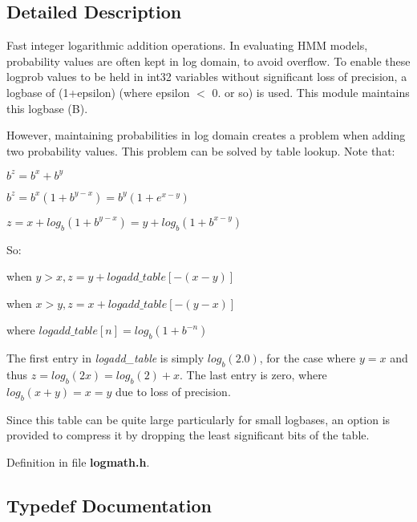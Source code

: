 \subsection{\-Detailed \-Description}
\-Fast integer logarithmic addition operations. \-In evaluating \-H\-M\-M models, probability values are often kept in log domain, to avoid overflow. \-To enable these logprob values to be held in int32 variables without significant loss of precision, a logbase of (1+epsilon) (where epsilon $<$ 0. or so) is used. \-This module maintains this logbase (\-B).

\-However, maintaining probabilities in log domain creates a problem when adding two probability values. \-This problem can be solved by table lookup. \-Note that\-:


\begin{DoxyItemize}
\item $ b^z = b^x + b^y $
\item $ b^z = b^x(1 + b^{y-x}) = b^y(1 + e^{x-y}) $
\item $ z = x + log_b(1 + b^{y-x}) = y + log_b(1 + b^{x-y}) $
\end{DoxyItemize}

\-So\-:


\begin{DoxyItemize}
\item when $ y > x, z = y + logadd\_table[-(x-y)] $
\item when $ x > y, z = x + logadd\_table[-(y-x)] $
\item where $ logadd\_table[n] = log_b(1 + b^{-n}) $
\end{DoxyItemize}

\-The first entry in {\itshape logadd\-\_\-table\/} is simply $ log_b(2.0) $, for the case where $ y = x $ and thus $ z = log_b(2x) = log_b(2) + x $. \-The last entry is zero, where $ log_b(x+y) = x = y $ due to loss of precision.

\-Since this table can be quite large particularly for small logbases, an option is provided to compress it by dropping the least significant bits of the table. 

\-Definition in file {\bf logmath.\-h}.



\subsection{\-Typedef \-Documentation}
